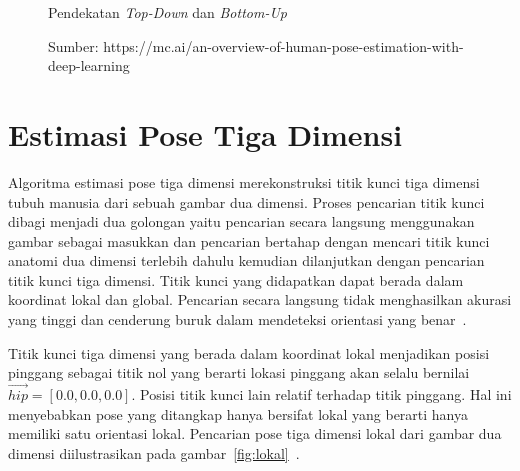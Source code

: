 \begin{figure}[htbp]
    \begin{center}
    \end{center}
    \vspace{-20pt}
    \captionsetup{labelfont=bf, textfont=bf}
    \caption{Pendekatan \textit{Top-Down} dan \textit{Bottom-Up}}
    \vspace{-10pt}
    \captionsetup{labelfont=md, textfont=md}
    \caption*{Sumber: https://mc.ai/an-overview-of-human-pose-estimation-with-deep-learning}
    \label{fig:tdbu}
\end{figure}

\section{Estimasi Pose Tiga Dimensi}
\label{sec:2-EstimasiPoseTigaDimensi}

Algoritma estimasi pose tiga dimensi merekonstruksi titik kunci tiga dimensi tubuh manusia dari
sebuah gambar dua dimensi. Proses pencarian titik kunci dibagi menjadi dua golongan yaitu pencarian
secara langsung menggunakan gambar sebagai masukkan dan pencarian bertahap dengan mencari titik kunci
anatomi dua dimensi terlebih dahulu kemudian dilanjutkan dengan pencarian titik kunci tiga dimensi.
Titik kunci yang didapatkan dapat berada dalam koordinat lokal dan global.
Pencarian secara langsung tidak menghasilkan akurasi yang tinggi dan cenderung buruk dalam mendeteksi
orientasi yang benar~\cite{2020arXiv200210322C}.

Titik kunci tiga dimensi yang berada dalam koordinat lokal menjadikan posisi pinggang sebagai titik
nol yang berarti lokasi pinggang akan selalu bernilai $\vec{hip} = [0.0, 0.0, 0.0]$. Posisi titik
kunci lain relatif terhadap titik pinggang. Hal ini menyebabkan pose yang ditangkap hanya bersifat
lokal yang berarti hanya memiliki satu orientasi lokal. Pencarian pose tiga dimensi lokal dari gambar
dua dimensi diilustrasikan pada gambar~\ref{fig:lokal}~\cite{martinez_2017_3dbaseline}.

